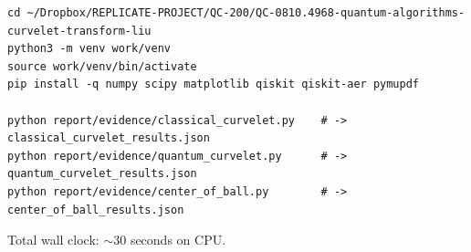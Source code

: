 \documentclass[11pt]{article}
\begin{document}
\begin{lstlisting}
cd ~/Dropbox/REPLICATE-PROJECT/QC-200/QC-0810.4968-quantum-algorithms-curvelet-transform-liu
python3 -m venv work/venv
source work/venv/bin/activate
pip install -q numpy scipy matplotlib qiskit qiskit-aer pymupdf

python report/evidence/classical_curvelet.py    # -> classical_curvelet_results.json
python report/evidence/quantum_curvelet.py      # -> quantum_curvelet_results.json
python report/evidence/center_of_ball.py        # -> center_of_ball_results.json
\end{lstlisting}

Total wall clock: $\sim$30 seconds on CPU.
\end{document}

